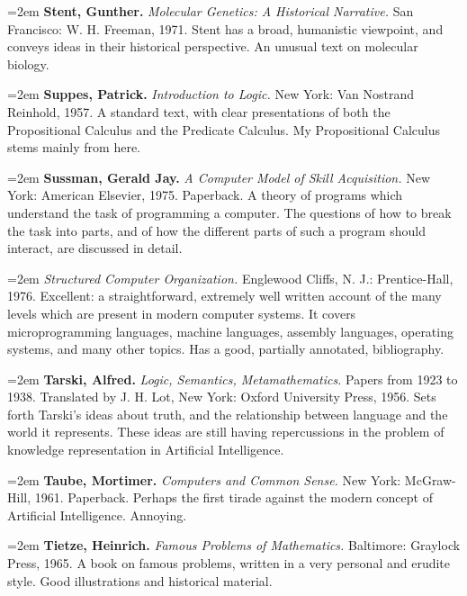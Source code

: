 \par\noindent\hangindent=2em {\bf Stent, Gunther.} {\it Molecular Genetics: A Historical Narrative.} San Francisco: W. H. Freeman, 1971. Stent has a broad, humanistic viewpoint, and conveys ideas in their historical perspective. An unusual text on molecular biology.

\par\noindent\hangindent=2em {\bf Suppes, Patrick.} {\it Introduction to Logic.} New York: Van Nostrand Reinhold, 1957. A standard text, with clear presentations of both the Propositional Calculus and the Predicate Calculus. My Propositional Calculus stems mainly from here.

\par\noindent\hangindent=2em {\bf Sussman, Gerald Jay.} {\it A Computer Model of Skill Acquisition.} New York: American Elsevier, 1975. Paperback. A theory of programs which understand the task of programming a computer. The questions of how to break the task into parts, and of how the different parts of such a program should interact, are discussed in detail.

\par\noindent\hangindent=2em  {\it Structured Computer Organization.} Englewood Cliffs, N. J.: Prentice-Hall, 1976. Excellent: a straightforward, extremely well written account of the many levels which are present in modern computer systems. It covers microprogramming languages, machine languages, assembly languages, operating systems, and many other topics. Has a good, partially annotated, bibliography.

\par\noindent\hangindent=2em {\bf Tarski, Alfred.} {\it Logic, Semantics, Metamathematics.} Papers from 1923 to 1938. Translated by J. H. Lot, New York: Oxford University Press, 1956. Sets forth Tarski's ideas about truth, and the relationship between language and the world it represents. These ideas are still having repercussions in the problem of knowledge representation in Artificial Intelligence.

\par\noindent\hangindent=2em {\bf Taube, Mortimer.} {\it Computers and Common Sense.} New York: McGraw-Hill, 1961. Paperback. Perhaps the first tirade against the modern concept of Artificial Intelligence. Annoying.

\par\noindent\hangindent=2em {\bf Tietze, Heinrich.} {\it Famous Problems of Mathematics.} Baltimore: Graylock Press, 1965. A book on famous problems, written in a very personal and erudite style. Good illustrations and historical material.

